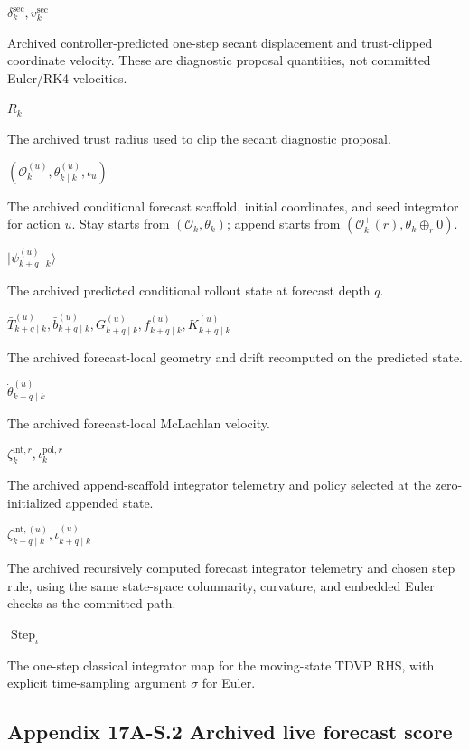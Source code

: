 \documentclass[10pt]{article}
\newcommand{\sym}[2]{%
  \noindent\begin{minipage}[t]{0.29\textwidth}\raggedright\textbf{\ensuremath{#1}}\end{minipage}%
  \hfill
  \begin{minipage}[t]{0.68\textwidth}\raggedright #2\end{minipage}\par\vspace{0.22em}}
\begin{document}
\sym{\delta_k^{\mathrm{sec}},v_k^{\mathrm{sec}}}{Archived controller-predicted one-step secant displacement and trust-clipped coordinate velocity. These are diagnostic proposal quantities, not committed Euler/RK4 velocities.}
\sym{R_k}{The archived trust radius used to clip the secant diagnostic proposal.}
\sym{(\mathcal O_k^{(u)},\theta_{k\mid k}^{(u)},\iota_u)}{The archived conditional forecast scaffold, initial coordinates, and seed integrator for action $u$. Stay starts from $(\mathcal O_k,\theta_k)$; append starts from $(\mathcal O_k^+(r),\theta_k\oplus_r0)$.}
\sym{|\psi_{k+q\mid k}^{(u)}\rangle}{The archived predicted conditional rollout state at forecast depth $q$.}
\sym{\bar T_{k+q\mid k}^{(u)},\bar b_{k+q\mid k}^{(u)},G_{k+q\mid k}^{(u)},f_{k+q\mid k}^{(u)},K_{k+q\mid k}^{(u)}}{The archived forecast-local geometry and drift recomputed on the predicted state.}
\sym{\dot\theta_{k+q\mid k}^{(u)}}{The archived forecast-local McLachlan velocity.}
\sym{\zeta_k^{\mathrm{int},r},\iota_k^{\mathrm{pol},r}}{The archived append-scaffold integrator telemetry and policy selected at the zero-initialized appended state.}
\sym{\zeta_{k+q\mid k}^{\mathrm{int},(u)},\iota_{k+q\mid k}^{(u)}}{The archived recursively computed forecast integrator telemetry and chosen step rule, using the same state-space columnarity, curvature, and embedded Euler checks as the committed path.}
\sym{\operatorname{Step}_{\iota}}{The one-step classical integrator map for the moving-state TDVP RHS, with explicit time-sampling argument $\sigma$ for Euler.}

\subsection*{Appendix 17A-S.2 Archived live forecast score}
\end{document}
